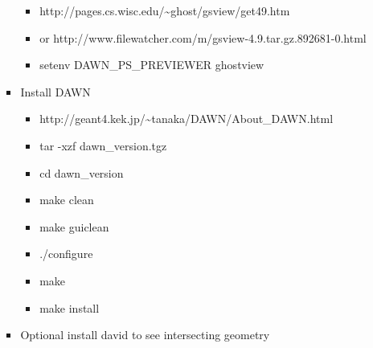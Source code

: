 \documentclass{article}
\begin{document}
\begin{itemize}
\begin{itemize}
\begin{itemize}
\begin{itemize}
\item http://pages.cs.wisc.edu/\~{}ghost/gsview/get49.htm
\item or http://www.filewatcher.com/m/gsview-4.9.tar.gz.892681-0.html
\item setenv DAWN\_PS\_PREVIEWER {\textquotedbl}ghostview{\textquotedbl}
\end{itemize}
\item Install DAWN

\begin{itemize}
\item http://geant4.kek.jp/\~{}tanaka/DAWN/About\_DAWN.html
\item tar -xzf dawn\_version.tgz
\item cd dawn\_version
\item make clean
\item make guiclean
\item ./configure
\item make
\item make install
\end{itemize}
\item Optional install david to see intersecting geometry


\end{itemize}
\end{itemize}
\end{itemize}
\end{document}
